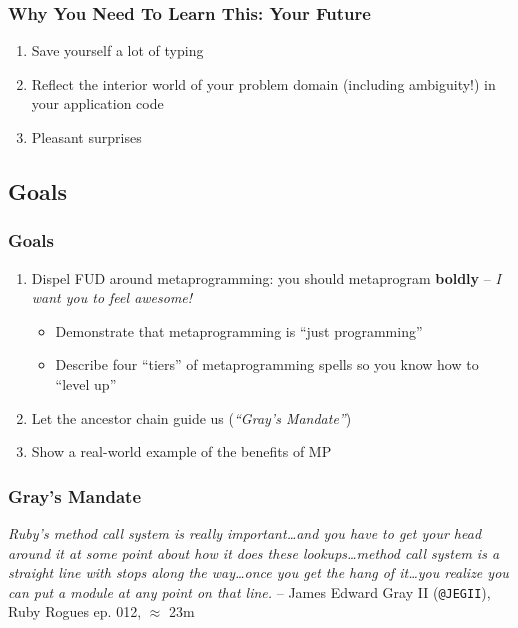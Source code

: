 \documentclass[slidestop,compress,mathserif]{beamer}
\begin{document}
\begin{frame}
	\frametitle{Why You Need To Learn This:  Your Future}
	\begin{enumerate}
		\item Save yourself a lot of typing
		\pause
		\item Reflect the interior world of your problem domain (including ambiguity!) in your application code
		\pause
		\item Pleasant surprises
	\end{enumerate}
\end{frame}

\subsection{Goals} %
\label{sub:goals}

\begin{frame}
	\frametitle{Goals}
	\begin{enumerate}
		\item Dispel FUD around metaprogramming: you should metaprogram \textbf{boldly} -- \emph{I want you to feel awesome!}
		\pause
		\begin{itemize}
			\item Demonstrate that metaprogramming is ``just programming''
			\pause
			\item Describe four ``tiers'' of metaprogramming spells so you know how to ``level up''
		\end{itemize}
		\pause
		\item Let the ancestor chain guide us (\emph{``Gray's Mandate''})
		\pause
		\item Show a real-world example of the benefits of MP
	\end{enumerate}
\end{frame}

\begin{frame}
	\frametitle{Gray's Mandate}
	\begin{center}
		\emph{Ruby's method call system is really important{\ldots}and you have to get your
head around it at some point about how it does these lookups{\ldots}method call
system is a straight line with stops along the way…once you get the hang of
it{\ldots}you realize you can put a module at any point on that line.}
	-- James Edward Gray II (\texttt{@JEGII}), Ruby Rogues ep. 012, $\approx$ 23m
	\end{center}
\end{frame}
\end{document}
